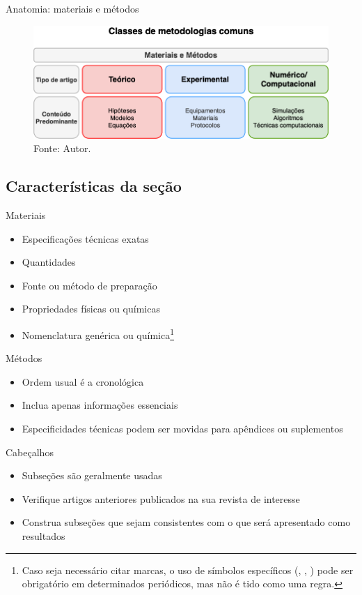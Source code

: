 \begin{frame}{Anatomia: materiais e métodos}
\begin{figure}
\centering
\includegraphics[scale=0.35]{figs/06/methods}
\caption{Fonte: Autor.}
\end{figure}
\end{frame}

\subsection{Características da seção}

\begin{frame}{Materiais}
\begin{itemize}
\item Especificações técnicas exatas 
\item Quantidades 
\item Fonte ou método de preparação
\item Propriedades físicas ou químicas 
\item Nomenclatura genérica ou química\footnote{Caso seja necessário citar marcas, o uso de símbolos específicos (\textcopyright, \textregistered, \texttrademark) pode ser obrigatório em determinados periódicos, mas não é tido como uma regra.} 
\end{itemize}
\end{frame}

\begin{frame}{Métodos}
\begin{itemize}
\item Ordem usual é a cronológica
\item Inclua apenas informações essenciais
\item Especificidades técnicas podem ser movidas para apêndices ou suplementos 
\end{itemize}
\end{frame}

\begin{frame}{Cabeçalhos}
\begin{itemize}
\item Subseções são geralmente usadas
\item Verifique artigos anteriores publicados na sua revista de interesse
\item Construa subseções que sejam consistentes com o que será apresentado como resultados 
\end{itemize}
\end{frame}

